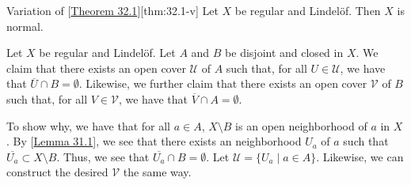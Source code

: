 \begin{thmBox}{Variation of [\hyperlink{thm:32.1}{Theorem 32.1}]}[thm:32.1-v]
    Let \( X \) be regular and Lindel\"{o}f.
    Then \( X \) is normal.

    \baseRule

    \begin{proofBox}
        Let \( X \) be regular and Lindel\"{o}f.
        Let \( A \) and \( B \) be disjoint and closed in \( X \).
        We claim that there exists an open cover \( \mathcal{U} \) of \( A \) such that,
        for all \( U \in \mathcal{U} \), we have that 
        \( \overline{ U } \cap B = \emptyset \).
        Likewise, we further claim that there exists an open cover \( \mathcal{V} \)
        of \( B \) such that, for all \( V \in \mathcal{V} \), we have that
        \( \overline{ V } \cap A = \emptyset \).

        \baseSkip

        To show why, we have that for all \( a \in A \), \( X \setminus B \) is an
        open neighborhood of \( a \) in \( X \).
        By [\hyperlink{lem:31.1}{Lemma 31.1}], we see that there exists an neighborhood 
        \( U_{ a } \) of \( a \)  such that 
        \( \overline{ U_{ a } } \subset X \setminus B \).
        Thus, we see that \( \overline{ U_{ a } } \cap B = \emptyset \).
        Let \( \mathcal{U} = \{ U_{ a } \mid a \in A \} \).
        Likewise, we can construct the desired \( \mathcal{V} \) the same way.

        \baseSkip


\end{proofBox}
\end{thmBox}
